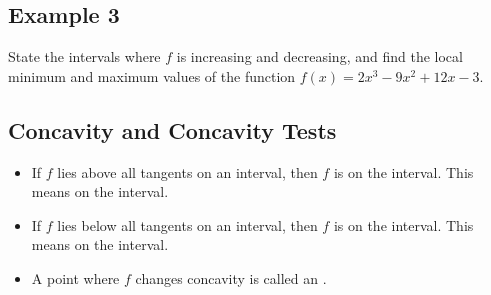 \documentclass[10pt]{book}
\theoremstyle{definition}
\begin{document}
\subsection*{Example 3} State the intervals where $f$ is increasing and decreasing, and find the local minimum and maximum values of the function $f(x)=2x^3-9x^2+12x-3$.
\clearpage
\begin{tcolorbox}
\subsection*{Concavity and Concavity Tests} 
\begin{itemize}
    \item If $f$ lies above all tangents on an interval, then $f$ is \underline{\hspace{3cm}} on the interval. This means \underline{\hspace{2cm}} on the interval.
    \item If $f$ lies below all tangents on an interval, then $f$ is \underline{\hspace{3cm}} on the interval. This means \underline{\hspace{2cm}} on the interval.
    \item A point where $f$ changes concavity is called an \underline{\hspace{4cm}}.
\end{itemize}
\end{tcolorbox}
\end{document}
